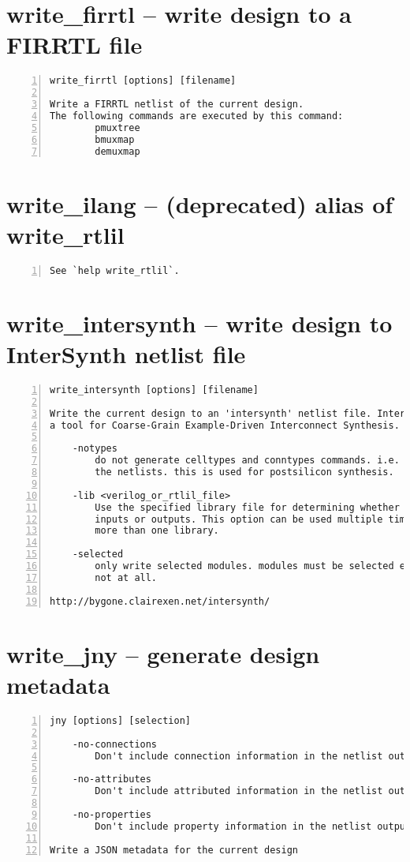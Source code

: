 \section{write\_firrtl -- write design to a FIRRTL file}
\label{cmd:write_firrtl}
\begin{lstlisting}[numbers=left,frame=single]
    write_firrtl [options] [filename]

Write a FIRRTL netlist of the current design.
The following commands are executed by this command:
        pmuxtree
        bmuxmap
        demuxmap
\end{lstlisting}

\section{write\_ilang -- (deprecated) alias of write\_rtlil}
\label{cmd:write_ilang}
\begin{lstlisting}[numbers=left,frame=single]
See `help write_rtlil`.
\end{lstlisting}

\section{write\_intersynth -- write design to InterSynth netlist file}
\label{cmd:write_intersynth}
\begin{lstlisting}[numbers=left,frame=single]
    write_intersynth [options] [filename]

Write the current design to an 'intersynth' netlist file. InterSynth is
a tool for Coarse-Grain Example-Driven Interconnect Synthesis.

    -notypes
        do not generate celltypes and conntypes commands. i.e. just output
        the netlists. this is used for postsilicon synthesis.

    -lib <verilog_or_rtlil_file>
        Use the specified library file for determining whether cell ports are
        inputs or outputs. This option can be used multiple times to specify
        more than one library.

    -selected
        only write selected modules. modules must be selected entirely or
        not at all.

http://bygone.clairexen.net/intersynth/
\end{lstlisting}

\section{write\_jny -- generate design metadata}
\label{cmd:write_jny}
\begin{lstlisting}[numbers=left,frame=single]
    jny [options] [selection]

    -no-connections
        Don't include connection information in the netlist output.

    -no-attributes
        Don't include attributed information in the netlist output.

    -no-properties
        Don't include property information in the netlist output.

Write a JSON metadata for the current design
\end{lstlisting}

